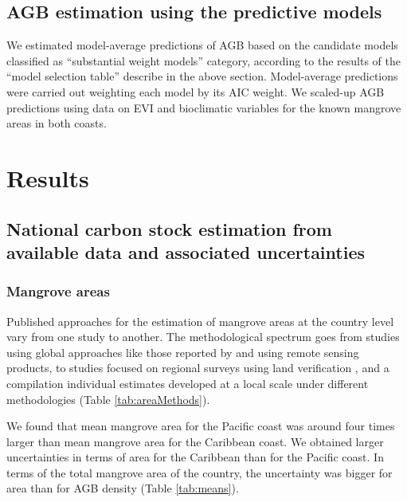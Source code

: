 \documentclass[review, authoryear]{elsarticle}   	%
\DeclareRobustCommand{\Jhoa}{\todo[author=Jhoa, inline, color=yellow!40, size=\small]}
\begin{document}
\subsection {AGB estimation using the predictive models}
We estimated model-average predictions of AGB based on the candidate models classified as ``substantial weight models'' category, according to the results of the ``model selection table'' describe in the above section. Model-average predictions were carried out weighting each model by its AIC weight. We scaled-up AGB predictions using data on EVI and bioclimatic variables for the known mangrove areas in both coasts. 



\section{Results}

\subsection{National carbon stock estimation from available data and associated uncertainties}
\subsubsection{Mangrove areas}
Published approaches for the estimation of mangrove areas at the country level vary from one study to another. The methodological spectrum goes from studies using global approaches like those reported by  \citet{Giri2011dataset, Giri2011} and  \citet{CONL:CONL12060} using remote sensing products,  to studies focused on regional surveys using land verification  \citep{FAO2007}, and a compilation individual estimates developed at a local scale under different methodologies \citet{INVEMAR2014} (Table \ref{tab:areaMethods}). 

We found that mean mangrove area for the Pacific coast was around four times larger than mean mangrove area for the Caribbean coast. We obtained larger uncertainties in terms of area for the Caribbean than for the Pacific coast. In terms of the total mangrove area of the country, the uncertainty was bigger for area than for AGB density (Table \ref{tab:means}).
\end{document}
